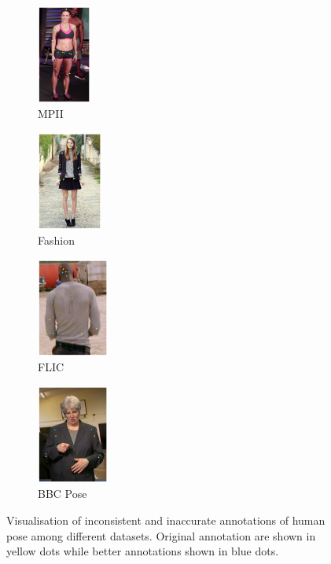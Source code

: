 \begin{figure}[t!]
    \centering
    \begin{subfigure}[b]{0.09125\textwidth}
            \includegraphics[height=3.25cm]{resources/MotivativeAnnotation/MPII}
            \caption{MPII}
    \end{subfigure}
    \hfill
    \begin{subfigure}[b]{0.1125\textwidth}
            \includegraphics[height=3.25cm]{resources/MotivativeAnnotation/FashionPose}
            \caption{Fashion}
    \end{subfigure}
  	\hfill
    \begin{subfigure}[b]{0.125\textwidth}
            \includegraphics[height=3.25cm]{resources/MotivativeAnnotation/FLIC}
            \caption{FLIC}
    \end{subfigure}
    \hfill
    \begin{subfigure}[b]{0.125\textwidth}
            \includegraphics[height=3.25cm]{resources/MotivativeAnnotation/BBCPose}
            \caption{BBC Pose}
    \end{subfigure}
    \caption{Visualisation of inconsistent and inaccurate annotations of human pose among different datasets. Original annotation are shown in yellow dots while better annotations shown in blue dots.}
    \label{fig:wrong_anno}
\end{figure}

